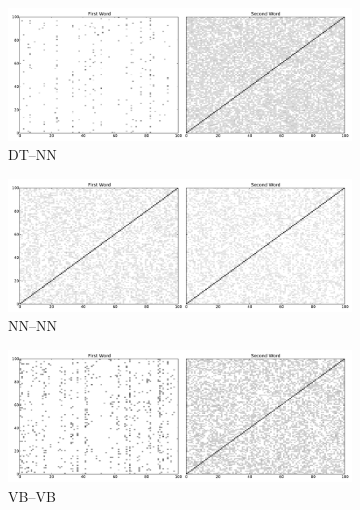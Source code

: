 \documentclass[11pt,letterpaper]{article}
\begin{document}
\begin{figure}[t!]
	\begin{center}
	\begin{subfigure}{\columnwidth}
		\centering
		\includegraphics[width=\columnwidth,keepaspectratio=true]{./dt_nn.pdf}	
		\caption{\small DT--NN}
		\label{fig:dt_nn}			
	\end{subfigure}
	\begin{subfigure}{\columnwidth}
		\centering
		\includegraphics[width=\columnwidth,keepaspectratio=true]{./nn_nn.pdf}		
		\caption {\small NN--NN}
		\label{fig:nn_nn}
	\end{subfigure}
	\end{center}
	\begin{center}
	\begin{subfigure}{\columnwidth}
		\centering
		\includegraphics[width=\columnwidth,keepaspectratio=true]{./vb_vb.pdf}		
		\caption {\small VB--VB}
		\label{fig:vb_vb}
	\end{subfigure}
	\begin{subfigure}{\columnwidth}

\end{subfigure}
\end{center}
\end{figure}
\end{document}
